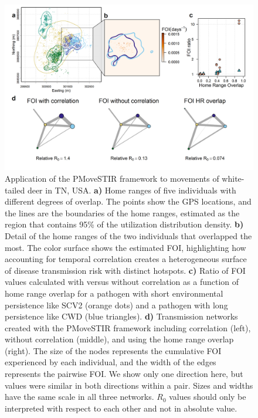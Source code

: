 \documentclass[letterpaper]{article}
\begin{document}
\begin{figure}
    \includegraphics[width=\textwidth]{figures/deer_results.png}
    \caption{\small Application of the PMoveSTIR framework to movements of white-tailed deer in TN, USA. \textbf{a)} Home ranges of five individuals with different degrees of overlap. The points show the GPS locations, and the lines are the boundaries of the home ranges, estimated as the region that contains 95\% of the utilization distribution density. \textbf{b)} Detail of the home ranges of the two individuals that overlapped the most. The color surface shows the estimated FOI, highlighting how accounting for temporal correlation creates a heterogeneous surface of disease transmission risk with distinct hotspots. \textbf{c)} Ratio of FOI values calculated with versus without correlation as a function of home range overlap for a pathogen with short environmental persistence like SCV2 (orange dots) and a pathogen with long persistence like CWD (blue triangles). \textbf{d)} Transmission networks created with the PMoveSTIR framework including correlation (left), without correlation (middle), and using the home range overlap (right). The size of the nodes represents the cumulative FOI experienced by each individual, and the width of the edges represents the pairwise FOI. We show only one direction here, but values were similar in both directions within a pair. Sizes and widths have the same scale in all three networks. $R_0$ values should only be interpreted with respect to each other and not in absolute value.}
  \label{fig:empiricalres}
\end{figure}

\clearpage



\end{document}
